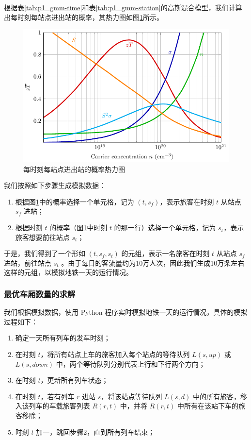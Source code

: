 \documentclass[12pt,a4paper]{mcmthesis}
\begin{document}
    根据表\ref{tab:p1_gmm-time}和表\ref{tab:p1_gmm-station}的高斯混合模型，我们计算出每时刻每站点进出站的概率，其热力图如图\ref{fig:p1_heatmap}所示。

    \begin{figure}[h]
        \centerline{\includegraphics[scale=0.4]{figures/fig1}\quad}
        \caption{\song\wuhao 每时刻每站点进出站的概率热力图}
        \label{fig:p1_heatmap}
    \end{figure}

    我们按照如下步骤生成模拟数据：

    \begin{enumerate}
        \item 根据图\ref{fig:p1_heatmap}中的概率选择一个单元格，记为 $(t,s_f)$，表示旅客在时刻 $t$ 从站点 $s_f$ 进站；
        \item 根据时刻 $t$ 的概率（图\ref{fig:p1_heatmap}中时刻 $t$ 的那一行）选择一个单元格，记为 $s_t$，表示旅客想要前往站点 $s_t$；
    \end{enumerate}

    于是，我们得到了一个形如 $(t,s_f,s_t)$ 的元组，表示一名旅客在时刻 $t$ 从站点 $s_f$ 进站，前往站点 $s_t$ 。由于每日的客流量约为10万人次，因此我们生成10万条左右这样的元组，以模拟地铁一天的运行情况。

    \subsubsection{最优车厢数量的求解}

    我们根据模拟数据，使用 Python 程序实时模拟地铁一天的运行情况，具体的模拟过程如下：

    \begin{enumerate}
        \item 确定一天所有列车的发车时刻；
        \item 在时刻 $t$，将所有站点上车的旅客加入每个站点的等待队列 $L(s,up)$ 或 $L(s,down)$ 中，两个等待队列分别代表上行和下行两个方向；
        \item 在时刻 $t$，更新所有列车状态；
        \item 在时刻 $t$，若有列车 $r$ 进站 $s$，将该站点等待队列 $L(s,d)$ 中的所有旅客，移入该列车的车载旅客列表 $R(r,t)$ 中，并将 $R(r,t)$ 中所有在该站下车的旅客移除；
        \item 时刻 $t$ 加一，跳回步骤2，直到所有列车结束；
    \end{enumerate}
\end{document}
